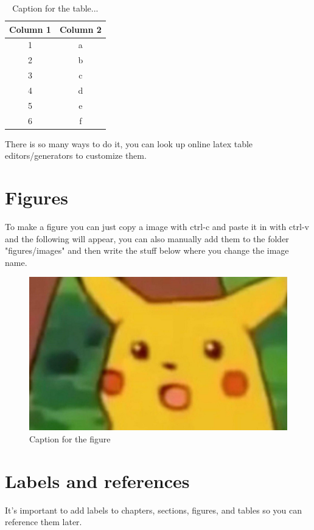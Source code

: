 \begin{table}[H]
    \centering
    \begin{tabular}{cc}
        \toprule
        \textbf{Column 1} & \textbf{Column 2} \\
        \midrule
        1  & a \\
        2  & b \\
        3  & c \\
        4  & d \\
        5  & e \\
        6  & f \\
        \bottomrule
    \end{tabular}
    \caption{Caption for the table...}
    \label{tab:placeholder}
\end{table}
There is so many ways to do it, you can look up online latex table editors/generators to customize them.

\section*{Figures}

To make a figure you can just copy a image with ctrl-c and paste it in with ctrl-v and the following will appear, you can also manually add them to the folder "figures/images" and then write the stuff below where you change the image name.

\begin{figure}[H]
    \centering
    \includegraphics[width=0.75\linewidth]{figures/images/pikachu.jpg}
    \caption{Caption for the figure}
    \label{fig:placeholder}
\end{figure}

\section*{Labels and references}
It’s important to add labels to chapters, sections, figures, and tables so you can reference them later.

